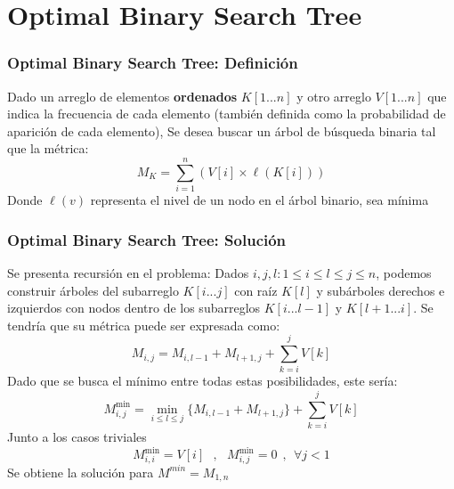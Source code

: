 \documentclass[10pt]{beamer}
\begin{document}
    \section{Optimal Binary Search Tree}
    \begin{frame}
        \frametitle{Optimal Binary Search Tree: Definición}
        Dado un arreglo de elementos \textbf{ordenados} $K[1...n]$ y otro arreglo $V[1...n]$ que indica la frecuencia de cada elemento (también definida como la probabilidad de aparición de cada elemento), 
        Se desea buscar un árbol de búsqueda binaria tal que la métrica:
        \begin{equation*}
            M_K = \sum_{i=1}^{n} (V[i] \times \ell(K[i]))
        \end{equation*}
        Donde $\ell(v)$ representa el nivel de un nodo en el árbol binario, sea mínima
    \end{frame}
    \begin{frame}
        \frametitle{Optimal Binary Search Tree: Solución}
        Se presenta recursión en el problema: Dados $i,j,l : 1\leq i \leq l\leq j\leq n$, podemos construir árboles del subarreglo $K[i...j]$ con raíz $K[l]$
        y subárboles derechos e izquierdos con nodos dentro de los subarreglos $K[i...l-1]$ y $K[l+1...i]$. Se tendría que su métrica puede ser expresada como:
        \begin{equation*}
            M_{i,j} = M_{i,l-1} + M_{l+1,j} + \sum_{k = i}^{j} V[k]
        \end{equation*}
        Dado que se busca el mínimo entre todas estas posibilidades, este sería:
        \begin{equation*}
            M_{i,j}^{\min} = \min_{i\leq l\leq j} \{M_{i,l-1} + M_{l+1,j}\} + \sum_{k = i}^{j} V[k]
        \end{equation*}
        Junto a los casos triviales
        \begin{equation*}
            M_{i,i}^{\min} = V[i] \ \ \ , \ \ \ M_{i,j}^{\min} = 0  \ \ , \ \ \forall j < 1
        \end{equation*}
        Se obtiene la solución para $M^{min} = M_{1,n}$
    \end{frame}
\end{document}
